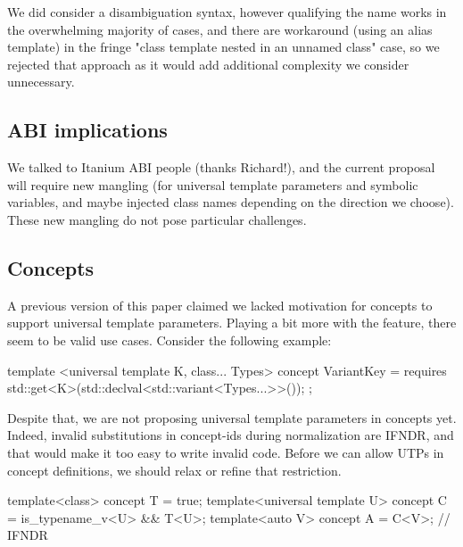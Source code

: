 \documentclass{wg21}
\begin{document}
We did consider a disambiguation syntax, however qualifying the name works in the overwhelming majority of cases,
and there are workaround (using an alias template) in the fringe "class template nested in an unnamed class" case,
so we rejected that approach as it would add additional complexity we consider unnecessary.

\subsection{ABI implications}

We talked to Itanium ABI people (thanks Richard!), and the current proposal will require new mangling (for universal template parameters and symbolic variables, and maybe injected class names depending on the direction we choose). These new mangling do not pose particular challenges.
\subsection{Concepts}

A previous version of this paper claimed we lacked motivation for concepts to support universal template parameters.
Playing a bit more with the feature, there seem to be valid use cases. Consider the following example:

\begin{colorblock}
template <universal template K,
          class... Types>
concept VariantKey = requires { std::get<K>(std::declval<std::variant<Types...>>()); };
\end{colorblock}

Despite that, we are not proposing universal template parameters in concepts yet.
Indeed, invalid substitutions in concept-ids during normalization are IFNDR, and that would make it too easy to write invalid code.
Before we can allow UTPs in concept definitions, we should relax or refine that restriction.

\begin{colorblock}

template<class> concept T = true;
template<universal template U> concept C = is_typename_v<U> && T<U>;
template<auto V> concept A = C<V>;   // IFNDR
\end{colorblock}


%
%
\end{document}
